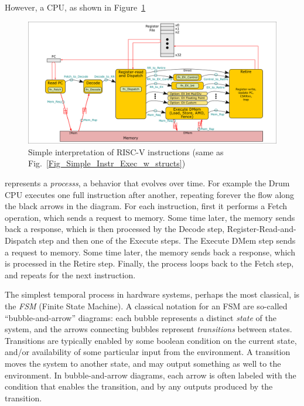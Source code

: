However, a CPU, as shown in Figure~\ref{Fig_FSMs_Simple_Instr_Exec}
\begin{figure}[htbp]
  \centerline{\includegraphics[width=6in,angle=0]{Figures/Fig_Instr_Exec_w_structs}}
  \caption{\label{Fig_FSMs_Simple_Instr_Exec}
           Simple interpretation of RISC-V instructions
	   (same as Fig.~\ref{Fig_Simple_Instr_Exec_w_structs})}
\end{figure}
represents a \emph{processs}, a behavior that evolves over time.  For
example the Drum CPU executes one full instruction after another,
repeating forever the flow along the black arrows in the diagram. For
each instruction, first it performs a Fetch operation, which sends a
request to memory. Some time later, the memory sends back a response,
which is then processed by the Decode step, Register-Read-and-Dispatch
step and then one of the Execute steps.  The Execute DMem step sends a
request to memory. Some time later, the memory sends back a response,
which is processed in the Retire step.  Finally, the process loops
back to the Fetch step, and repeats for the next instruction.

The simplest temporal process in hardware systems, perhaps the most
classical, is the \emph{FSM} (Finite State Machine).  A classical
notation for an FSM are so-called ``bubble-and-arrow'' diagrams: each
bubble represents a distinct \emph{state} of the system, and the
arrows connecting bubbles represent \emph{transitions} between states.
Transitions are typically enabled by some boolean condition on the
current state, and/or availability of some particular input from the
environment.  A transition moves the system to another state, and may
output something as well to the environment.  In bubble-and-arrow
diagrams, each arrow is often labeled with the condition that enables
the transition, and by any outputs produced by the transition.


